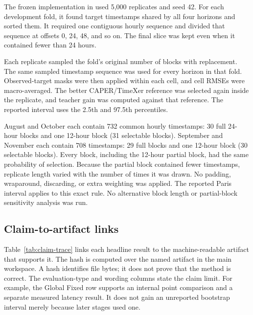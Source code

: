 The frozen implementation in  used 5,000 replicates and seed 42.  For each development fold, it found target timestamps shared by all four horizons and sorted them.  It required one contiguous hourly sequence and divided that sequence at offsets 0, 24, 48, and so on.  The final slice was kept even when it contained fewer than 24 hours.

Each replicate sampled the fold's original number of blocks with replacement.  The same sampled timestamp sequence was used for every horizon in that fold.  Observed-target masks were then applied within each cell, and cell RMSEs were macro-averaged.  The better CAPER/TimeXer reference was selected again inside the replicate, and teacher gain was computed against that reference.  The reported interval uses the 2.5th and 97.5th percentiles.

August and October each contain 732 common hourly timestamps: 30 full 24-hour blocks and one 12-hour block (31 selectable blocks).  September and November each contain 708 timestamps: 29 full blocks and one 12-hour block (30 selectable blocks).  Every block, including the 12-hour partial block, had the same probability of selection.  Because the partial block contained fewer timestamps, replicate length varied with the number of times it was drawn.  No padding, wraparound, discarding, or extra weighting was applied.  The reported Paris interval applies to this exact rule.  No alternative block length or partial-block sensitivity analysis was run.

\subsection{Claim-to-artifact links}
\label{sec:appendix-claim-lineage}
\label{app:claim-lineage}

Table~\ref{tab:claim-trace} links each headline result to the machine-readable artifact that supports it.  The hash is computed over the named artifact in the main workspace.  A hash identifies file bytes; it does not prove that the method is correct.  The evaluation-type and wording columns state the claim limit.  For example, the Global Fixed row supports an internal point comparison and a separate measured latency result.  It does not gain an unreported bootstrap interval merely because later stages used one.



\FloatBarrier


